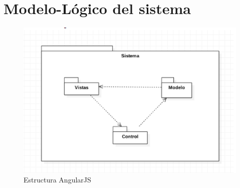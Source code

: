 \section{Modelo-Lógico del sistema}
\begin{figure}[htbp!]
		\centering
			\includegraphics[width=1\textwidth]{images/logico31}
		\caption{Estructura AngularJS}
	\end{figure}





